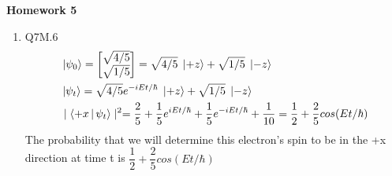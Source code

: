 \documentclass{article}
\providecommand{\Matrix}[1] {\begin{bmatrix} #1 \end{bmatrix}}
\theoremstyle{definition}
\theoremstyle{plain}
\begin{document}
\begin{center} \bf \LARGE Homework 5\\
\end{center}


\begin {enumerate}[itemindent=30pt,label=\bf Exercise {\arabic*}:]

\item Q7M.6\\
\begin{align*}
	&\Ket{\psi_{0}} = \Matrix{\sqrt{4/5} \\ \sqrt{1/5}} = \sqrt{4/5}\; \Ket{+z} + \sqrt{1/5} \;\Ket{-z}\\
	& \Ket{\psi_{t}} = \sqrt{4/5}e^{-iEt/\hbar}\; \Ket{+z} + \sqrt{1/5} \;\Ket{-z}\\
	&\mid \Braket{+x | \psi_{t}} \mid^2 = \dfrac{2}{5} + \dfrac{1}{5} e^{iEt/\hbar} + \dfrac{1}{5} e^{-iEt/\hbar} + \dfrac{1}{10} = \dfrac{1}{2} + \dfrac{2}{5} cos(Et/\hbar)
\end{align*}
\subitem The probability that we will determine this electron's spin to be in the +x direction at time t is $\dfrac{1}{2} + \dfrac{2}{5} cos(Et/\hbar)$


\end{enumerate}
\end{document}
